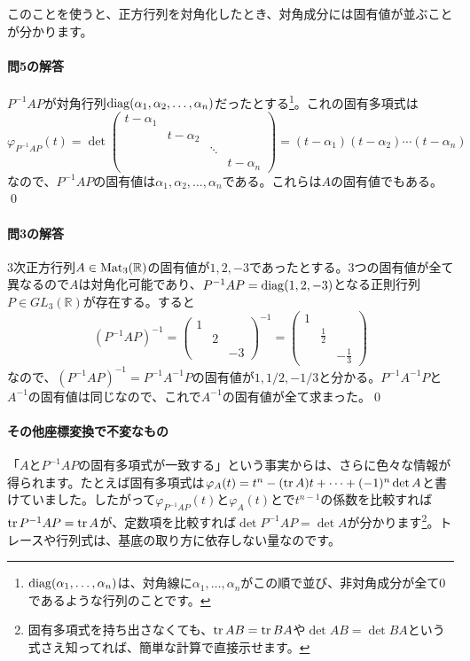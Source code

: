 このことを使うと、正方行列を対角化したとき、対角成分には固有値が並ぶことが分かります。

\paragraph{問5の解答}
$P^{-1} A P$が対角行列$\operatorname{diag}(\alpha_1, \alpha_2, \ldots, \alpha_n)$だったとする\footnote{$\operatorname{diag}(\alpha_1, \ldots, \alpha_n)$は、対角線に$\alpha_1, \ldots, \alpha_n$がこの順で並び、非対角成分が全て$0$であるような行列のことです。}。これの固有多項式は
\[
\varphi_{P^{-1} A P}(t)
= \det
\begin{pmatrix}
t - \alpha_1 \\
& t - \alpha_2 \\
& & \ddots \\
& & & t - \alpha_n
\end{pmatrix}
= (t - \alpha_1) (t - \alpha_2) \cdots (t - \alpha_n)
\]
なので、$P^{-1} A P$の固有値は$\alpha_1, \alpha_2, \ldots, \alpha_n$である。これらは$A$の固有値でもある。 \qed

\paragraph{問3の解答}
$3$次正方行列$A \in \operatorname{Mat}_3(\mathbb{R})$の固有値が$1, 2, -3$であったとする。$3$つの固有値が全て異なるので$A$は対角化可能であり、$P^{-1} A P = \operatorname{diag}(1, 2, -3)$となる正則行列$P \in GL_3(\mathbb{R})$が存在する。すると
\[
(P^{-1} A P)^{-1}
=
\begin{pmatrix}
1 \\
& 2 \\
& & -3
\end{pmatrix}^{-1}
=
\begin{pmatrix}
1 \\
& \frac{1}{2} \\
& & -\frac{1}{3}
\end{pmatrix}
\]
なので、$(P^{-1} A P)^{-1} = P^{-1} A^{-1} P$の固有値が$1, 1/2, -1/3$と分かる。$P^{-1} A^{-1} P$と$A^{-1}$の固有値は同じなので、これで$A^{-1}$の固有値が全て求まった。\qed

\paragraph{その他座標変換で不変なもの}

「$A$と$P^{-1} A P$の固有多項式が一致する」という事実からは、さらに色々な情報が得られます。たとえば固有多項式は$\varphi_A(t) = t^n - (\operatorname{tr} A) t + \cdots + (-1)^n \det A$と書けていました。したがって$\varphi_{P^{-1} A P}(t)$と$\varphi_A(t)$とで$t^{n - 1}$の係数を比較すれば$\operatorname{tr} P^{-1} A P = \operatorname{tr} A$が、定数項を比較すれば$\det P^{-1} A P = \det A$が分かります\footnote{固有多項式を持ち出さなくても、$\operatorname{tr} AB = \operatorname{tr} BA$や$\det AB = \det BA$という式さえ知ってれば、簡単な計算で直接示せます。}。トレースや行列式は、基底の取り方に依存しない量なのです。

